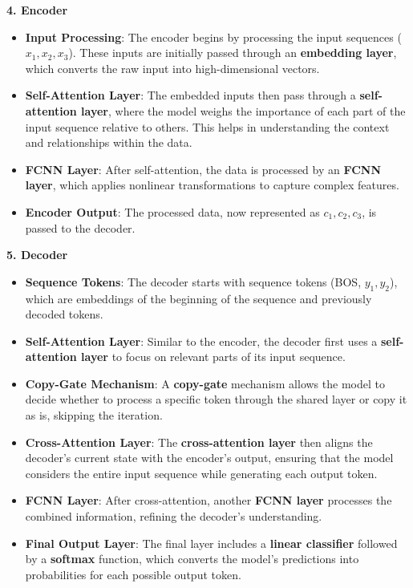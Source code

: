 \documentclass{article}
\begin{document}
\textbf{4. Encoder}
\begin{itemize}
    \item \textbf{Input Processing}: The encoder begins by processing the input sequences (\(x_1, x_2, x_3\)). These inputs are initially passed through an \textbf{embedding layer}, which converts the raw input into high-dimensional vectors.
    \item \textbf{Self-Attention Layer}: The embedded inputs then pass through a \textbf{self-attention layer}, where the model weighs the importance of each part of the input sequence relative to others. This helps in understanding the context and relationships within the data.
    \item \textbf{FCNN Layer}: After self-attention, the data is processed by an \textbf{FCNN layer}, which applies nonlinear transformations to capture complex features.
    \item \textbf{Encoder Output}: The processed data, now represented as \(c_1, c_2, c_3\), is passed to the decoder.
\end{itemize}

\textbf{5. Decoder}
\begin{itemize}
    \item \textbf{Sequence Tokens}: The decoder starts with sequence tokens (BOS, \(y_1, y_2\)), which are embeddings of the beginning of the sequence and previously decoded tokens.
    \item \textbf{Self-Attention Layer}: Similar to the encoder, the decoder first uses a \textbf{self-attention layer} to focus on relevant parts of its input sequence.
    \item \textbf{Copy-Gate Mechanism}: A \textbf{copy-gate} mechanism allows the model to decide whether to process a specific token through the shared layer or copy it as is, skipping the iteration.
    \item \textbf{Cross-Attention Layer}: The \textbf{cross-attention layer} then aligns the decoder’s current state with the encoder’s output, ensuring that the model considers the entire input sequence while generating each output token.
    \item \textbf{FCNN Layer}: After cross-attention, another \textbf{FCNN layer} processes the combined information, refining the decoder’s understanding.
    \item \textbf{Final Output Layer}: The final layer includes a \textbf{linear classifier} followed by a \textbf{softmax} function, which converts the model’s predictions into probabilities for each possible output token.
\end{itemize}
\end{document}
